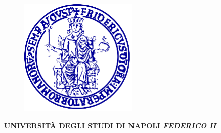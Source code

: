 \documentclass[11pt,oneside]{amsart}
\begin{document}
\begin{titlepage}
\begin{center}
\begin{figure}[htpb]
    \begin{center}
    \includegraphics[scale=1.5]{unina.png}
    \end{center}
\end{figure}
%
\vspace{-.5 cm}

\textbf{{\LARGE U}{\large NIVERSIT\`A}  {\LARGE D}{\large EGLI}  {\LARGE S}{\large TUDI}  {\LARGE D}{\large I}  {\LARGE N}{\large APOLI}  \textit{{\LARGE F}{\large EDERICO II}}}


\end{center}
\end{titlepage}
\end{document}
